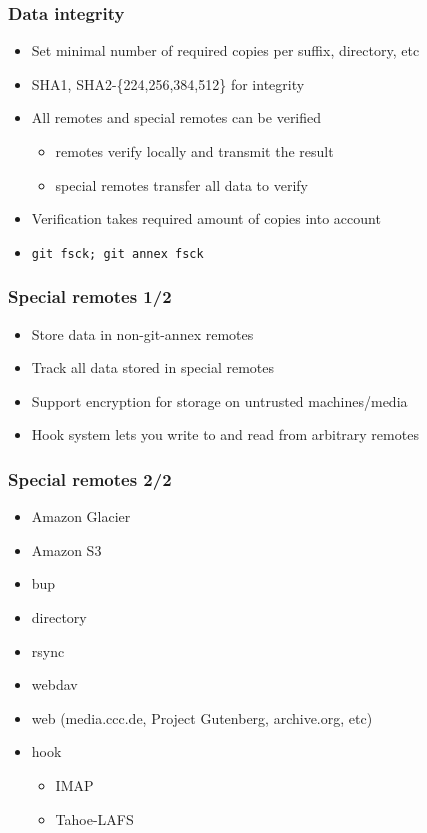 \documentclass[t]{beamer}
\begin{document}
\begin{frame}
	\frametitle{Data integrity}
	\begin{itemize}
		\item Set minimal number of required copies per suffix, directory, etc
		\item SHA1, SHA2-\{224,256,384,512\} for integrity
		\item All remotes and special remotes can be verified
		\begin{itemize}
			\item remotes verify locally and transmit the result
			\item special remotes transfer all data to verify
		\end{itemize}
		\item Verification takes required amount of copies into account
		\item \texttt{git fsck; git annex fsck}
	\end{itemize}
\end{frame}

\begin{frame}
	\frametitle{Special remotes 1/2}
	\begin{itemize}
		\item Store data in non-git-annex remotes
		\item Track all data stored in special remotes
		\item Support encryption for storage on untrusted machines/media
		\item Hook system lets you write to and read from arbitrary remotes
	\end{itemize}
\end{frame}

\begin{frame}
	\frametitle{Special remotes 2/2}
	\begin{itemize}
		\item Amazon Glacier
		\item Amazon S3
		\item bup
		\item directory
		\item rsync
		\item webdav
		\item web (media.ccc.de, Project Gutenberg, archive.org, etc)
		\item hook
		\begin{itemize}
			\item IMAP
			\item Tahoe-LAFS
		\end{itemize}
	\end{itemize}
\end{frame}
\end{document}
